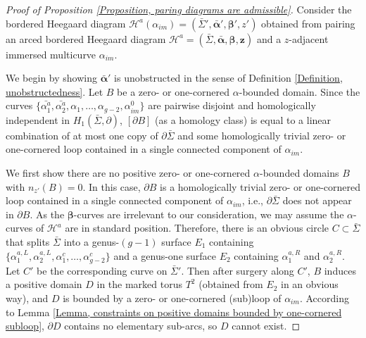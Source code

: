\documentclass{amsart}
\theoremstyle{definition}
\theoremstyle{remark}
\numberwithin{equation}{section}
\numberwithin{equation}{section} \makeatletter
\begin{document}
\begin{proof}[Proof of Proposition \ref{Proposition, paring diagrams are admissible}] Consider the bordered Heegaard diagram $\mathcal{H}^a(\alpha_{im})=(\bar{\Sigma}',\bar{\bm{\alpha}}',\bm{\beta}',z')$ obtained from pairing an arced bordered Heegaard diagram $\mathcal{H}^a=(\bar{\Sigma},\bar{\bm{\alpha}},\bm{\beta},\bm{z})$ and a $z$-adjacent immersed multicurve $\alpha_{im}$. 

We begin by showing $\bar{\bm{\alpha}}'$ is unobstructed in the sense of Definition \ref{Definition, unobstructedness}. Let $B$ be a zero- or one-cornered $\alpha$-bounded domain. Since the curves $\{\bar{\alpha_1^a},\bar{\alpha_2^a},\alpha_1,\ldots,\alpha_{g-2},\alpha_{im}^0\}$ are pairwise disjoint and homologically independent in $H_1(\bar{\Sigma},\partial)$, $[\partial B]$ (as a homology class) is equal to a linear combination of at most one copy of $\partial\bar{\Sigma}$ and some homologically trivial zero- or one-cornered loop contained in a single connected component of $\alpha_{im}$. 

We first show there are no positive zero- or one-cornered $\alpha$-bounded domains $B$ with $n_{z'}(B)=0$. In this case, $\partial B$ is a homologically trivial zero- or one-cornered loop contained in a single connected component of $\alpha_{im}$, i.e., $\partial\bar{\Sigma}$ does not appear in $\partial B$. As the $\bm{\beta}$-curves are irrelevant to our consideration, we may assume the $\alpha$-curves of $\mathcal{H}^a$ are in standard position. Therefore, there is an obvious circle $C\subset\bar{\Sigma}$ that splits $\bar{\Sigma}$ into a genus-$(g-1)$ surface $E_1$ containing $\{\alpha^{a,L}_1,\alpha^{a,L}_2,\alpha^c_1,\ldots,\alpha^c_{g-2}\}$ and a genus-one surface $E_2$ containing $\alpha^{a,R}_1$ and $\alpha^{a,R}_2$. Let $C'$ be the corresponding curve on $\bar{\Sigma}'$. Then after surgery along $C'$, $B$ induces a positive domain $D$ in the marked torus $T^2$ (obtained from $E_2$ in an obvious way), and $D$ is bounded by a zero- or one-cornered (sub)loop of $\alpha_{im}$. According to Lemma \ref{Lemma, constraints on positive domains bounded by one-cornered subloop}, $\partial D$ contains no elementary sub-arcs, so $D$ cannot exist.


\end{proof}
\end{document}
